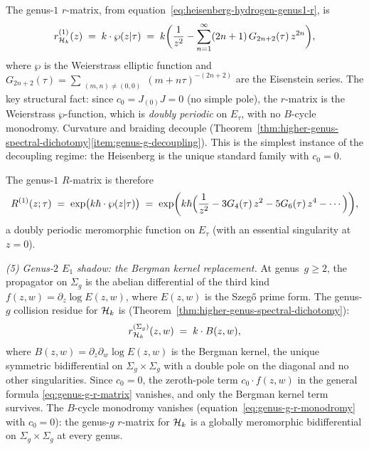 \begin{computation}
The genus-$1$ $r$-matrix, from
equation~\eqref{eq:heisenberg-hydrogen-genus1-r}, is
\begin{equation}\label{eq:e1-genus1-r}
r^{(1)}_{\mathcal{H}_k}(z)
\;=\;
k\cdot\wp(z|\tau)
\;=\;
k\biggl(
\frac{1}{z^2}
- \sum_{n=1}^{\infty}(2n+1)\, G_{2n+2}(\tau)\, z^{2n}
\biggr),
\end{equation}
where $\wp$ is the Weierstrass elliptic function and
$G_{2n+2}(\tau) = \sum_{\substack{(m,n) \neq (0,0)}}
(m + n\tau)^{-(2n+2)}$ are the Eisenstein series. The
key structural fact: since $c_0 = J_{(0)}J = 0$ (no simple pole),
the $r$-matrix is the Weierstrass $\wp$-function, which is
\emph{doubly periodic} on $E_\tau$, with no $B$-cycle monodromy.
Curvature and braiding decouple
(Theorem~\ref{thm:higher-genus-spectral-dichotomy}\ref{item:genus-g-decoupling}).
This is the simplest instance of the decoupling
regime: the Heisenberg is the unique standard family with $c_0 = 0$.

The genus-$1$ $R$-matrix is therefore
\begin{equation}\label{eq:e1-genus1-R}
R^{(1)}(z;\tau)
\;=\;
\exp\bigl(k\hbar\cdot\wp(z|\tau)\bigr)
\;=\;
\exp\biggl(
k\hbar\Bigl(
\frac{1}{z^2}
- 3G_4(\tau)\, z^2
- 5G_6(\tau)\, z^4
- \cdots
\Bigr)
\biggr),
\end{equation}
a doubly periodic meromorphic function on $E_\tau$ (with
an essential singularity at $z = 0$).

\smallskip
\noindent
\emph{(5) Genus-$2$ $E_1$ shadow: the Bergman kernel replacement.}
At genus~$g \ge 2$, the propagator on $\Sigma_g$ is the abelian
differential of the third kind $f(z,w) = \partial_z \log E(z,w)$,
where $E(z,w)$ is the Szeg\H{o} prime form. The genus-$g$
collision residue for $\mathcal{H}_k$ is
(Theorem~\ref{thm:higher-genus-spectral-dichotomy}):
\begin{equation}\label{eq:e1-genus-g-r}
r^{(\Sigma_g)}_{\mathcal{H}_k}(z,w)
\;=\;
k \cdot B(z,w),
\end{equation}
where $B(z,w) = \partial_z \partial_w \log E(z,w)$ is the
Bergman kernel, the unique symmetric bidifferential on
$\Sigma_g \times \Sigma_g$ with a double pole on the diagonal
and no other singularities. Since $c_0 = 0$, the zeroth-pole
term $c_0 \cdot f(z,w)$ in the general formula
\eqref{eq:genus-g-r-matrix} vanishes, and only the Bergman
kernel term survives. The $B$-cycle monodromy vanishes
(equation~\eqref{eq:genus-g-r-monodromy} with $c_0 = 0$):
the genus-$g$ $r$-matrix for $\mathcal{H}_k$ is a globally meromorphic
bidifferential on $\Sigma_g \times \Sigma_g$ at every genus.


\end{computation}
